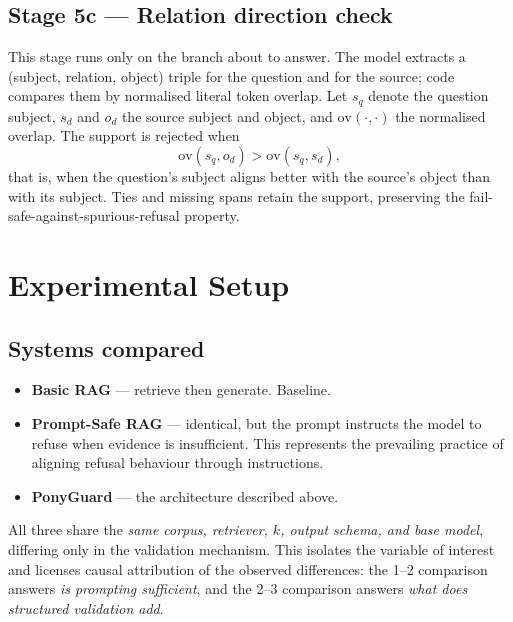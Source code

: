 \documentclass[conference]{IEEEtran}
\begin{document}
\subsection{Stage 5c --- Relation direction check}
\label{sec:direction}

This stage runs only on the branch about to answer. The model extracts a
(subject, relation, object) triple for the question and for the source; code
compares them by normalised literal token overlap. Let $s_q$ denote the question
subject, $s_d$ and $o_d$ the source subject and object, and
$\mathrm{ov}(\cdot,\cdot)$ the normalised overlap. The support is rejected when
\begin{equation}
\mathrm{ov}(s_q, o_d) > \mathrm{ov}(s_q, s_d),
\label{eq:direction}
\end{equation}
that is, when the question's subject aligns better with the source's object than
with its subject. Ties and missing spans retain the support, preserving the
fail-safe-against-spurious-refusal property.

\section{Experimental Setup}

\subsection{Systems compared}

\begin{itemize}
  \item \textbf{Basic RAG} --- retrieve then generate. Baseline.
  \item \textbf{Prompt-Safe RAG} --- identical, but the prompt instructs the model
        to refuse when evidence is insufficient. This represents the prevailing
        practice of aligning refusal behaviour through instructions.
  \item \textbf{PonyGuard} --- the architecture described above.
\end{itemize}

All three share the \emph{same corpus, retriever, $k$, output schema, and base
model}, differing only in the validation mechanism. This isolates the variable of
interest and licenses causal attribution of the observed differences: the
1--2 comparison answers \emph{is prompting sufficient}, and the 2--3 comparison
answers \emph{what does structured validation add}.
\end{document}
